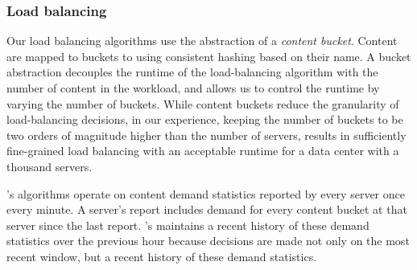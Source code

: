 %
%

\subsubsection{Load balancing}

Our load balancing algorithms use the abstraction of a \emph{content bucket}. Content are mapped to buckets to using consistent hashing based on their name. A bucket abstraction decouples the runtime of the load-balancing algorithm with the number of content in the workload, and allows us to control the runtime by varying the number of buckets. While content buckets reduce the granularity of load-balancing decisions, in our experience, keeping the number of buckets to be two orders of magnitude higher than the number of servers, results in sufficiently fine-grained load balancing with an acceptable runtime for a data center with a thousand servers.

\shrink's algorithms operate on content demand statistics reported by every server once every minute. A server's report includes demand for every content bucket at that server since the last report.  \shrink's maintains a recent history of these demand statistics over the previous hour because decisions are made not only on the most recent window, but a recent history of these demand statistics. 

%



